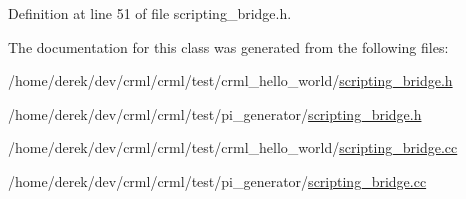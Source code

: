 Definition at line 51 of file scripting\_\-bridge.h.



The documentation for this class was generated from the following files:\begin{DoxyCompactItemize}
\item 
/home/derek/dev/crml/crml/test/crml\_\-hello\_\-world/\hyperlink{test_2crml__hello__world_2scripting__bridge_8h}{scripting\_\-bridge.h}\item 
/home/derek/dev/crml/crml/test/pi\_\-generator/\hyperlink{test_2pi__generator_2scripting__bridge_8h}{scripting\_\-bridge.h}\item 
/home/derek/dev/crml/crml/test/crml\_\-hello\_\-world/\hyperlink{test_2crml__hello__world_2scripting__bridge_8cc}{scripting\_\-bridge.cc}\item 
/home/derek/dev/crml/crml/test/pi\_\-generator/\hyperlink{test_2pi__generator_2scripting__bridge_8cc}{scripting\_\-bridge.cc}\end{DoxyCompactItemize}
